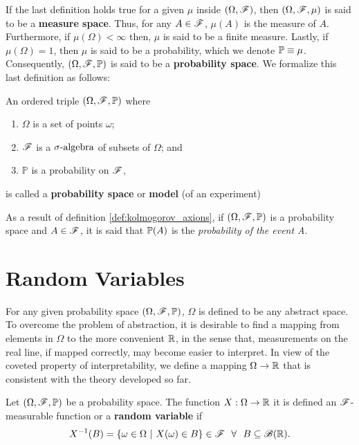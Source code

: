 \documentclass[../TGMAFFIRO.tex]{subfiles}
\begin{document}
If the last definition holds true for a given $\mu$ inside $(\Omega, \mathscr{F})$, then $(\Omega, \mathscr{F}, \mu)$ is said to be a \textbf{measure space}. Thus, for any $A\in\mathscr{F}$, $\mu(A)$ is the measure of $A$.\\

 Furthermore, if $\mu(\Omega) < \infty$ then, $\mu$ is said to be a finite measure. Lastly, if  $\mu(\Omega) = 1$, then $\mu$ is said to be a probability, which we denote $\mathbb{P} \equiv \mu$. Consequently, $(\Omega, \mathscr{F}, \mathbb{P})$ is said to be a \textbf{probability space}. We formalize this last definition as follows:

\begin{definition}\label{def:kolmogorov_axions}
	An ordered triple $(\Omega, \mathscr{F}, \mathbb{P})$ where
	\begin{enumerate}
		\item $\Omega$ is a set of points $\omega$;
		\item $\mathscr{F}$ is a $\sigma\text{-algebra}$ of subsets of $\Omega$; and
		\item $\mathbb P$ is a probability on $\mathscr{F}$,
	\end{enumerate}
	is called a \textbf{probability space} or \textbf{model} (of an experiment)
\end{definition}

As a result of definition \ref{def:kolmogorov_axions}, if $(\Omega, \mathscr{F}, \mathbb{P})$ is a probability space and $A \in \mathscr{F}$, it is said that $\mathbb{P}(A)$ is the \textit{probability of the event A}.

\section{Random Variables}
For any given probability space $(\Omega, \mathscr{F}, \mathbb{P})$, $\Omega$ is defined to be any abstract space. To overcome the problem of abstraction, it is desirable to find a mapping from elements in $\Omega$ to the more convenient $\mathbb{R}$, in the sense that, measurements on the real line, if mapped correctly, may become easier to interpret. In view of the coveted property of interpretability, we define a mapping $\Omega\to\mathbb{R}$ that is consistent with the theory developed so far.

\begin{definition}\label{def:rvar}
	Let $(\Omega, \mathscr{F}, \mathbb{P})$ be a probability space. The function $X: \Omega \rightarrow \mathbb{R}$ it is defined an $\mathscr{F}$-measurable function or a \textbf{random variable} if
	\begin{equation}
		X^{-1}(B) = \{\omega \in \Omega \ | \ X(\omega) \in B\} \in \mathscr{F} \ \ \forall \ \ B \subseteq \mathscr{B}(\mathbb{R}).
	\end{equation}
\end{definition}
\end{document}
